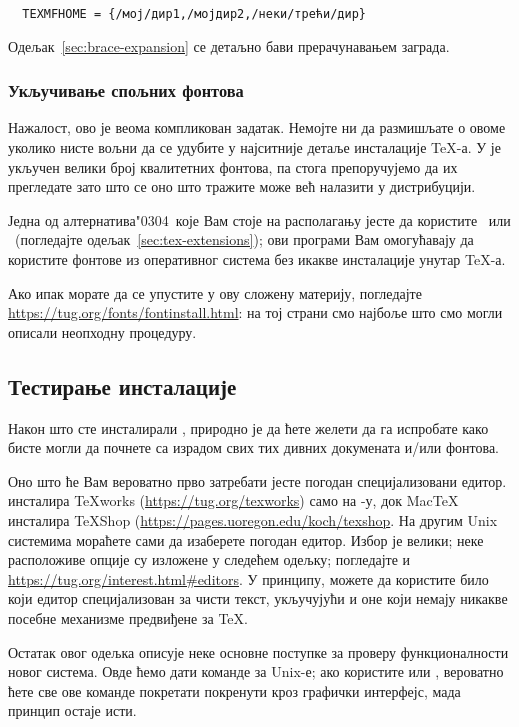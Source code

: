 \documentclass{article}
\begin{document}
\begin{verbatim}
  TEXMFHOME = {/мој/дир1,/мојдир2,/неки/трећи/дир}
\end{verbatim}

Одељак~\ref{sec:brace-expansion} се детаљно бави прерачунавањем
заграда.


\subsubsection{Укључивање спољних фонтова}

Нажалост, ово је веома компликован задатак. Немојте ни да размишљате
о овоме уколико нисте вољни да се удубите у најситније детаље
инсталације \TeX{}-а. У \TL{} је укључен велики број квалитетних
фонтова, па стога препоручујемо да их прегледате зато што се оно што
тражите може већ налазити у дистрибуцији.

Једна од алтернатива\char"0304\ које Вам стоје на располагању јесте
да користите \XeTeX\ или \LuaTeX\ (погледајте
одељак~\ref{sec:tex-extensions}); ови програми Вам омогућавају да
користите фонтове из оперативног система без икакве инсталације
унутар \TeX-а.

Ако ипак морате да се упустите у ову сложену материју, погледајте
\url{https://tug.org/fonts/fontinstall.html}: на тој страни смо
најбоље што смо могли описали неопходну процедуру.


\subsection{Тестирање инсталације}
\label{sec:test-install}

Након што сте инсталирали \TL{}, природно је да ћете желети да га
испробате како бисте могли да почнете са израдом свих тих дивних
докумената и\slash или фонтова.

Оно што ће Вам вероватно прво затребати јесте погодан специјализовани
едитор. \TL{} инсталира \TeX{}works
(\url{https://tug.org/texworks}) само на \Windows{}-у, док Mac\TeX
инсталира TeXShop
(\url{https://pages.uoregon.edu/koch/texshop}. На другим Unix системима
мораћете сами да изаберете погодан едитор. Избор је велики; неке
расположиве опције су изложене у следећем одељку; погледајте и
\url{https://tug.org/interest.html#editors}. У принципу, можете да
користите било који едитор специјализован за чисти текст, укључујући
и оне који немају никакве посебне механизме предвиђене за \TeX.

Остатак овог одељка описује неке основне поступке за проверу
функционалности новог система. Овде ћемо дати команде за Unix-е; ако
користите \MacOSX{} или \Windows{}, вероватно ћете све ове команде
покретати покренути кроз графички интерфејс, мада принцип остаје исти.
\end{document}
